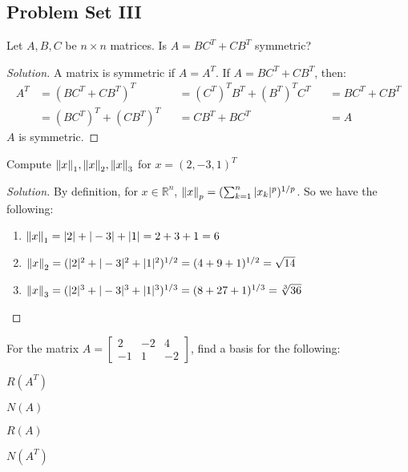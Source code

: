 \documentclass[../main.tex]{subfiles}
\begin{document}
\subsection{Problem Set III}
%
\begin{problem}
Let $A,B,C$ be $n\times n$ matrices. Is $A = BC^T + CB^T$ symmetric?
\end{problem}
\begin{proof}[Solution]
A matrix is symmetric if $A = A^T$. If $A = BC^T+CB^T$, then:
\begin{align*}
    A^T &= (BC^T+CB^T)^T & &= (C^T)^TB^T + (B^T)^TC^T & &= BC^T + CB^T\\
    &=  (BC^T)^T + (CB^T)^T & &= CB^T + BC^T & &= A
\end{align*}
$A$ is symmetric.
\end{proof}
%
\clearpage
%
\begin{problem}
Compute $\norm{x}_1, \norm{x}_2, \norm{x}_3$ for $x = (2,-3,1)^T$
\end{problem}
\begin{proof}[Solution]
By definition, for $x\in \mathbb{R}^n$, $\norm{x}_p = (\sum_{k=1}^{n}|x_k|^p)^{1/p}$. So we have the following:
\begin{enumerate}
\item $\norm{x}_1 = |2|+|-3|+|1| = 2+3+1 = 6$
\item $\norm{x}_2 = (|2|^2+|-3|^2+|1|^2)^{1/2} = (4+9+1)^{1/2} = \sqrt{14}$
\item $\norm{x}_3 = (|2|^3+|-3|^3+|1|^3)^{1/3} = (8+27+1)^{1/3} = \sqrt[3]{36}$
\end{enumerate}
\end{proof}
%
\begin{problem}
For the matrix $A = \begin{bmatrix} 2 & -2 & 4 \\ -1 & 1 & -2 \end{bmatrix}$, find a basis for the following:
\begin{enumerate}
\begin{multicols}{4}
\item $R(A^T)$
\item $N(A)$
\item $R(A)$
\item $N(A^T)$
\end{multicols}
\end{enumerate}
\end{problem}
\end{document}
